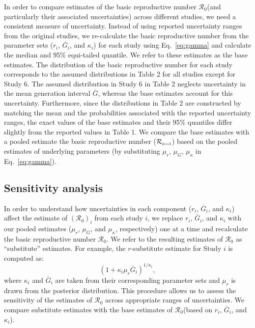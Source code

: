 \documentclass[12pt]{article}
\newcommand{\eref}[1]{Eq.~\ref{eq:#1}}
\newcommand{\Ro}{\ensuremath{{\mathcal R}_{0}}\xspace}
\newcommand{\Rpool}{\ensuremath{{\mathcal R}_{\textrm{\tiny{pool}}}}\xspace}
\begin{document}
In order to compare estimates of the basic reproductive number \Ro (and particularly their associated uncertainties) across different studies, we need a consistent measure of uncertainty.
Instead of using reported uncertainty ranges from the original studies, we re-calculate the basic reproductive number from the parameter sets ($r_i$, $\bar G_i$, and $\kappa_i$) for each study using \eref{gamma} and calculate the median and 95\% equi-tailed quantile.
We refer to these estimates as the base estimates.
The distribution of the basic reproductive number for each study corresponds to the assumed distributions in Table 2 for all studies except for Study 6.
The assumed distribution in Study 6 in Table 2 neglects uncertainty in the mean generation interval $\bar G$, whereas the base estimates account for this uncertainty.
Furthermore, since the distributions in Table 2 are constructed by matching the mean and the probabilities associated with the reported uncertainty ranges, the exact values of the base estimates and their 95\% quantiles differ slightly from the reported values in Table 1.
We compare the base estimates with a pooled estimate the basic reproductive number (\Rpool) based on the pooled estimates of underlying parameters (by substituting $\mu_r$, $\mu_G$, $\mu_\kappa$ in \eref{gamma}). 

\subsection{Sensitivity analysis}

In order to understand how uncertainties in each component ($r_i$, $\bar G_i$, and $\kappa_i$) affect the estimate of $(\Ro)_i$ from each study $i$, we replace $r_i$, $\bar G_i$, and $\kappa_i$ with our pooled estimates ($\mu_r$, $\mu_G$, and $\mu_\kappa$, respectively) one at a time and recalculate the basic reproductive number \Ro.
We refer to the resulting estimates of \Ro as ``substitute'' estimates.
For example, the $r$-substitute estimate for Study $i$ is computed as:
\begin{equation}
\left(1 + \kappa_i \mu_r \bar{G}_i\right)^{1/\kappa_i},
\end{equation}
where $\kappa_i$ and $\bar{G}_i$ are taken from their corresponding parameter sets and $\mu_r$ is drawn from the posterior distribution.
This procedure allows us to assess the sensitivity of the estimates of \Ro across appropriate ranges of uncertainties.
We compare substitute estimates with the base estimates of \Ro (based on $r_i$, $\bar G_i$, and $\kappa_i$).
\end{document}
